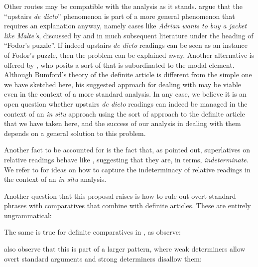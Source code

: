 \documentclass[output=paper
,modfonts
,nonflat]{langsci/langscibook}
\begin{document}
Other routes may be compatible with the analysis as it stands. \citet{CoppockBeaver2014} argue that the ``upstairs \textit{de dicto}'' phenomenon is part of a more general phenomenon that requires an explanation anyway, namely cases like \textit{Adrian wants to buy a jacket like Malte's}, discussed by \citet{Fodor1970} and in much subsequent literature under the heading of ``Fodor's puzzle''. If indeed upstairs \textit{de dicto} readings can be seen as an instance of Fodor's puzzle, then the problem can be explained away. Another alternative is offered by \citet{Bumford2016}, who posits a sort of  that is subordinated to the modal element. Although Bumford's theory of the definite article is different from the simple one we have sketched here, his suggested approach for dealing with  may be viable even in the context of a more standard analysis. In any case, we believe it is an open question whether upstairs \textit{de dicto} readings can indeed be managed in the context of an \textit{in situ} approach using the sort of approach to the definite article that we have taken here, and the success of our analysis in dealing with them depends on a general solution to this problem.

Another fact to be accounted for is the fact that, as \citet{Szabolcsi1986} pointed out, superlatives on relative readings behave like , suggesting that they are, in  terms, \textit{indeterminate}. We refer to \citet{CoppockBeaver2014} for ideas on how to capture the indeterminacy of relative readings in the context of an \textit{in situ} analysis.

Another question that this proposal raises is how to rule out overt standard phrases with comparatives that combine with definite articles. These are entirely ungrammatical:

\z

The same is true for definite comparatives in , as \citet{LernerPinkal1995} observe:

\z 

\citet{LernerPinkal1995} also observe that this is part of a larger pattern, where weak determiners allow overt standard arguments and strong determiners disallow them:
\end{document}
